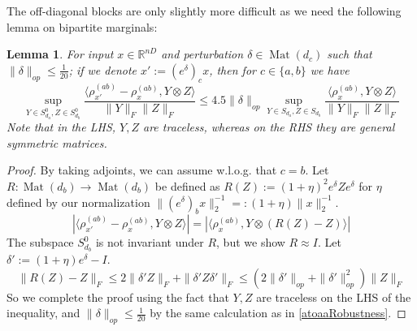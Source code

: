 \documentclass[aos]{imsart}
\newtheorem{lemma}[theorem]{Lemma}
\theoremstyle{definition}
\numberwithin{equation}{section}
\DeclareMathOperator{\mat}{Mat}
\newcommand{\R}{{\mathbb{R}}}
\newcommand{\smallSym}{S}
\newcommand{\samp}{x}
\begin{document}
\begin{appendix}
The off-diagonal blocks are only slightly more difficult as we need the following lemma on bipartite marginals:

\begin{lemma} \label{btoabRobustness}
For input $\samp \in \R^{nD}$ and perturbation $\delta \in \mat(d_{c})$ such that $\|\delta\|_{op} \leq \frac{1}{20}$; if we denote $\samp' := (e^{\delta})_{c} \samp$, then for $c \in \{a,b\}$ we have
\[ \sup_{Y \in \smallSym_{d_{a}}^{0}, Z \in \smallSym_{d_{b}}^{0}} \frac{\langle \rho_{\samp'}^{(ab)} - \rho_{\samp}^{(ab)}, Y \otimes Z \rangle}{\|Y\|_{F} \|Z\|_{F}} \leq 4.5 \|\delta\|_{op} \sup_{Y \in \smallSym_{d_{a}}, Z \in \smallSym_{d_{b}}} \frac{\langle \rho_{\samp}^{(ab)}, Y \otimes Z \rangle}{\|Y\|_{F} \|Z\|_{F}}        \]
Note that in the LHS, $Y,Z$ are traceless, whereas on the RHS they are general symmetric matrices.
\end{lemma}
\begin{proof}
By taking adjoints, we can assume w.l.o.g. that $c = b$. Let $R : \mat(d_{b}) \to \mat(d_{b})$ be defined as $R(Z) := (1+\eta)^{2} e^{\delta} Z e^{\delta}$ for $\eta$ defined by our normalization $\|(e^{\delta})_{b} \samp\|_{2}^{-1} =: (1+\eta) \|\samp\|_{2}^{-1}$.
\[ |\langle \rho_{\samp'}^{(ab)} - \rho_{\samp}^{(ab)}, Y \otimes Z \rangle| = |\langle \rho_{\samp}^{(ab)}, Y \otimes (R(Z) - Z) \rangle|  \]
The subspace $\smallSym_{d_{b}}^{0}$ is not invariant under $R$, but we show $R \approx I$. Let $\delta' := (1+\eta) e^{\delta} - I$.
\[ \|R(Z) - Z\|_{F} \leq 2 \|\delta' Z\|_{F} + \|\delta' Z \delta'\|_{F} \leq (2 \|\delta'\|_{op} + \|\delta'\|_{op}^{2}) \|Z\|_{F}    \]
So we complete the proof using the fact that $Y,Z$ are traceless on the LHS of the inequality, and $\|\delta\|_{op} \leq \frac{1}{20}$ by the same calculation as in \cref{atoaaRobustness}.
\end{proof}


\end{appendix}
\end{document}
